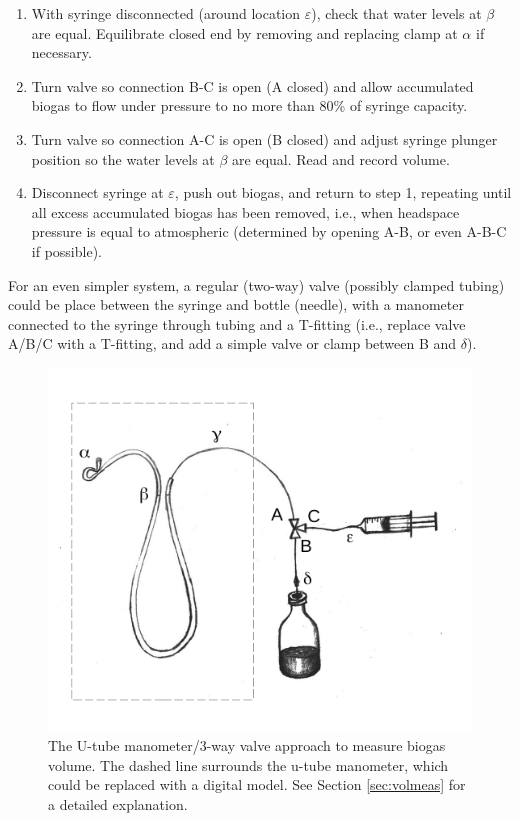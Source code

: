 \documentclass[]{article}
\begin{document}
\begin{enumerate}
  \item With syringe disconnected (around location $\varepsilon$), check that water levels at $\beta$ are equal. Equilibrate closed end by removing and replacing clamp at $\alpha$ if necessary.
  \item Turn valve so connection B-C is open (A closed) and allow accumulated biogas to flow under pressure to no more than 80\% of syringe capacity.
  \item Turn valve so connection A-C is open (B closed) and adjust syringe plunger position so the water levels at $\beta$ are equal. Read and record volume.
  \item Disconnect syringe at $\varepsilon$, push out biogas, and return to step 1, repeating until all excess accumulated biogas has been removed, i.e., when headspace pressure is equal to atmospheric (determined by opening A-B, or even A-B-C if possible).
\end{enumerate}

For an even simpler system, a regular (two-way) valve (possibly clamped tubing) could be place between the syringe and bottle (needle), with a manometer connected to the syringe through tubing and a T-fitting (i.e., replace valve A/B/C with a T-fitting, and add a simple valve or clamp between B and $\delta$).

\begin{figure}
  \includegraphics[]{figs/GD_utube.pdf}
  \caption{The U-tube manometer/3-way valve approach to measure biogas volume. The dashed line surrounds the u-tube manometer, which could be replaced with a digital model. See Section \ref{sec:volmeas} for a detailed explanation.} 
  \label{fig:utube}
\end{figure}
\end{document}
